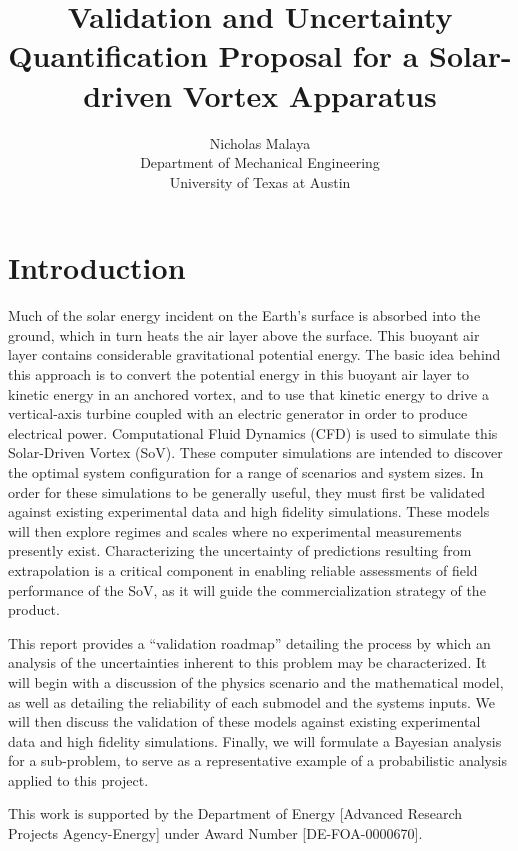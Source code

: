\documentclass{article}
\title{Validation and Uncertainty Quantification Proposal for a
Solar-driven Vortex Apparatus}
\author{Nicholas Malaya\\ Department of Mechanical Engineering \\
University of Texas at Austin}
\date{}
\begin{document}
\maketitle
\newpage

\section{Introduction}
Much of the solar energy incident on the Earth's surface is absorbed
into the ground, which in turn heats the air layer above the surface.
This buoyant air layer contains considerable gravitational potential
energy. The basic idea behind this approach is to convert the 
potential energy in this buoyant air layer to kinetic energy in an
anchored vortex, and to use that kinetic energy to drive a
vertical-axis turbine coupled with an electric generator in order to
produce electrical power. Computational Fluid Dynamics (CFD) is used to
simulate this Solar-Driven Vortex (SoV). These computer simulations are
intended to discover the optimal system configuration for a range of
scenarios and system sizes. In order for these simulations to be
generally useful, they must first be validated against existing
experimental data and high fidelity simulations. These models
will then explore regimes and scales where no experimental measurements
presently exist. Characterizing the uncertainty of predictions resulting
from extrapolation is a critical component in enabling reliable
assessments of field performance of the SoV, as it will guide the
commercialization strategy of the product. 

This report provides a ``validation roadmap'' detailing the process by
which an analysis of the uncertainties inherent to this
problem may be characterized.  It will begin with a discussion of the
physics scenario and the mathematical model, as well as detailing the
reliability of each submodel and the systems inputs. We will then
discuss the validation of these models against existing experimental
data and high fidelity simulations. Finally, we will formulate a Bayesian
analysis for a sub-problem, to serve as a representative example of a
probabilistic analysis applied to this project.  


%
%
\newpage
This work is supported by the Department of Energy [Advanced Research
Projects Agency-Energy] under Award Number [DE-FOA-0000670].   
\end{document}
